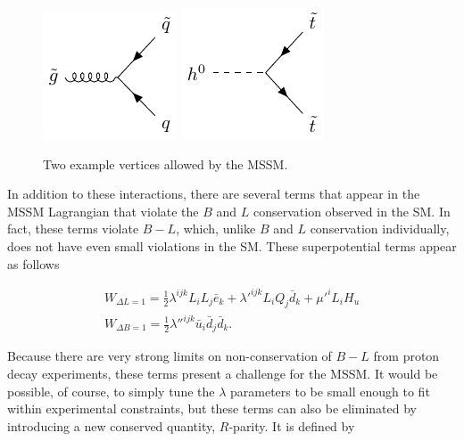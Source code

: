 \begin{centering}
\begin{figure}[!hbt]
\myfloatalign
\includegraphics[width=.45\linewidth]{feynman/gluino.pdf}
\includegraphics[width=.45\linewidth]{feynman/higgs_stop.pdf}
\caption{Two example vertices allowed by the \ac{MSSM}.}
\label{fig:mssm_int}
\end{figure}
\end{centering}

In addition to these interactions, there are several terms that appear in the \ac{MSSM} Lagrangian that violate the $B$ and $L$ conservation observed in the \ac{SM}. In fact, these terms violate $B-L$, which, unlike $B$ and $L$ conservation individually, does not have even small violations in the \ac{SM}. These superpotential terms appear as follows

\begin{eqnarray}
W_{\Delta L = 1} = \frac{1}{2}\lambda^{ijk}L_i L_j \bar{e}_k + \lambda'^{ijk}L_i Q_j \bar{d}_k + \mu'^i L_i H_u \\
W_{\Delta B = 1} = \frac{1}{2}\lambda''^{ijk}\bar{u}_i \bar{d}_j \bar{d}_k .
\label{eq:rviol}
\end{eqnarray}

Because there are very strong limits on non-conservation of $B-L$ from proton decay experiments, these terms present a challenge for the \ac{MSSM}. It would be possible, of course, to simply tune the $\lambda$ parameters to be small enough to fit within experimental constraints, but these terms can also be eliminated by introducing a new conserved quantity, $R$-parity. It is defined by

